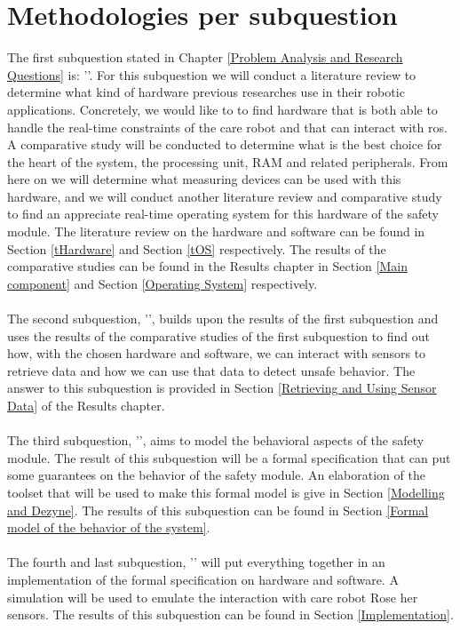 \documentclass[12pt]{scrreprt}
\begin{document}
\section{Methodologies per subquestion}
\label{Methodologies per subquestion}
The first subquestion stated in Chapter \ref{Problem Analysis and Research Questions} is: '\sqone'. For this subquestion we will conduct a literature review to determine what kind of hardware previous researches use in their robotic applications. Concretely, we would like to to find hardware that is both able to handle the real-time constraints of the care robot and that can interact with \acrshort{ros}. A comparative study will be conducted to determine what is the best choice for the heart of the system, the processing unit, RAM and related peripherals. From here on we will determine what measuring devices can be used with this hardware, and we will conduct another literature review and comparative study to find an appreciate real-time operating system for this hardware of the safety module. The literature review on the hardware and software can be found in Section \ref{tHardware} and Section \ref{tOS} respectively. The results of the comparative studies can be found in the Results chapter in Section \ref{Main component} and Section \ref{Operating System} respectively.
\\\\
The second subquestion, '\sqtwo', builds upon the results of the first subquestion and uses the results of the comparative studies of the first subquestion to find out how, with the chosen hardware and software, we can interact with sensors to retrieve data and how we can use that data to detect unsafe behavior. The answer to this subquestion is provided in Section \ref{Retrieving and Using Sensor Data} of the Results chapter.
\\\\
The third subquestion, '\sqthree', aims to model the behavioral aspects of the safety module. The result of this subquestion will be a formal specification that can put some guarantees on the behavior of the safety module. An elaboration of the toolset that will be used to make this formal model is give in Section \ref{Modelling and Dezyne}. The results of this subquestion can be found in Section \ref{Formal model of the behavior of the system}.
\\\\
The fourth and last subquestion, '\sqfour' will put everything together in an implementation of the formal specification on hardware and software. A simulation will be used to emulate the interaction with care robot Rose her sensors. The results of this subquestion can be found in Section \ref{Implementation}.
\end{document}
